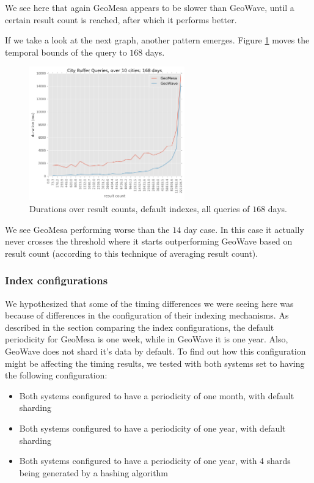 We see here that again GeoMesa appears to be slower than GeoWave,
until a certain result count is reached,
after which it performs better.

If we take a look at the next graph, another pattern emerges.
Figure \ref{durationresultall168} moves the temporal bounds of the query to $168$ days.

\begin{figure}[h!tb]
  \centering
  \includegraphics[width=0.60\textwidth]{../docs/img/gdelt/168-days-default.png}
  \caption{Durations over result counts, default indexes, all queries of $168$ days.}
  \label{durationresultall168}
\end{figure}

We see GeoMesa performing worse than the $14$ day case.
In this case it actually never crosses the threshold where it starts outperforming GeoWave based on result count
(according to this technique of averaging result count).

\subsubsection{Index configurations}

We hypothesized that some of the timing differences we were seeing here was because of differences in the configuration
of their indexing mechanisms. As described in the section comparing the index configurations, the default periodicity
for GeoMesa is one week, while in GeoWave it is one year. Also, GeoWave does not shard it's data by default.
To find out how this configuration might be affecting the timing results, we tested with both systems set
to having the following configuration:

\begin{itemize}
\item Both systems configured to have a periodicity of one month, with default sharding
\item Both systems configured to have a periodicity of one year, with default sharding
\item Both systems configured to have a periodicity of one year, with 4 shards being generated by a hashing algorithm
\end{itemize}

